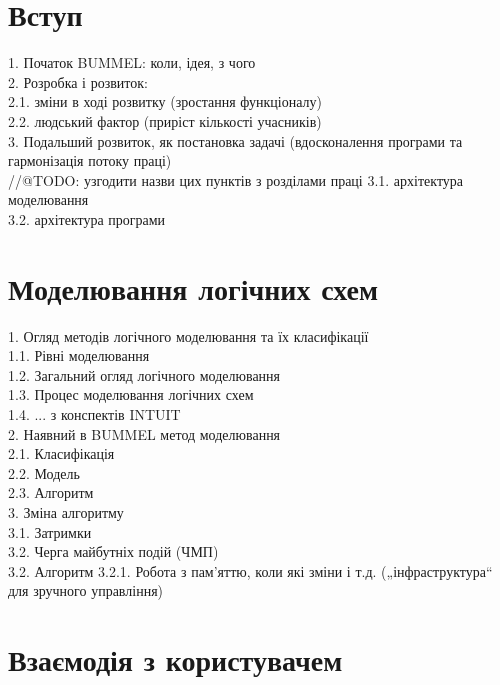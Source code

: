 \documentclass[12pt,a4paper]{article}
\begin{document}
\fontsize{14pt}{6mm}\selectfont

\tableofcontents
\clearpage
\pagestyle{plain}
\section{Вступ}

1. Початок BUMMEL: коли, ідея, з чого \cite{alias}\\
2. Розробка і розвиток:\\
  2.1. зміни в ході розвитку (зростання функціоналу)\\
  2.2. людський фактор (приріст кількості учасників)\\
3. Подальший розвиток, як постановка задачі (вдосконалення програми та гармонізація потоку праці)\\
//@TODO: узгодити назви цих пунктів з розділами праці
  3.1. архітектура моделювання\\
  3.2. архітектура програми

\clearpage

\section{Моделювання логічних схем}

1. Огляд методів логічного моделювання та їх класифікації\\
  1.1. Рівні моделювання\\
  1.2. Загальний огляд логічного моделювання\\
  1.3. Процес моделювання логічних схем\\
  1.4. ... {з конспектів INTUIT}\\
2. Наявний в BUMMEL метод моделювання\\
  2.1. Класифікація\\
  2.2. Модель\cite{v1-model(element, circuit)}\\
  2.3. Алгоритм\\
3. Зміна алгоритму\\
  3.1. Затримки\\
  3.2. Черга майбутніх подій (ЧМП)\\
  3.2. Алгоритм
    3.2.1. Робота з пам’яттю, коли які зміни і т.д. („інфраструктура“ для зручного управління)

\clearpage

\section{Взаємодія з користувачем}
\end{document}
